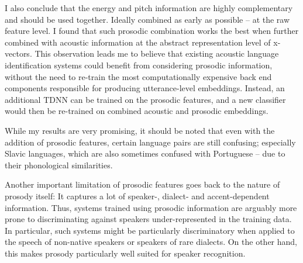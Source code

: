 \documentclass[bsc,frontabs,twoside,singlespacing,parskip,deptreport]{infthesis}
\begin{document}
{{    %
    I also conclude that the energy and pitch information are highly complementary and should be used together. Ideally combined as early as possible -- at the raw feature level.
    I found that such prosodic combination works the best when further combined with acoustic information at the abstract representation level of x-vectors. This observation leads me to believe that existing acoustic language identification systems could benefit from considering prosodic information, without the need to re-train the most computationally expensive back end components responsible for producing utterance-level embeddings. Instead, an additional TDNN can be trained on the prosodic features, and a new classifier would then be re-trained on combined acoustic and prosodic embeddings.

    While my results are very promising, it should be noted that even with the addition of prosodic features, certain language pairs are still confusing; especially Slavic languages, which are also sometimes confused with Portuguese -- due to their phonological similarities.

    Another important limitation of prosodic features goes back to the nature of prosody itself: It captures a lot of speaker-, dialect- and accent-dependent information. Thus, systems trained using prosodic information are arguably more prone to discriminating against speakers under-represented in the training data. In particular, such systems might be particularly discriminatory when applied to the speech of non-native speakers or speakers of rare dialects. On the other hand, this makes prosody particularly well suited for speaker recognition.
  }
}
\end{document}
